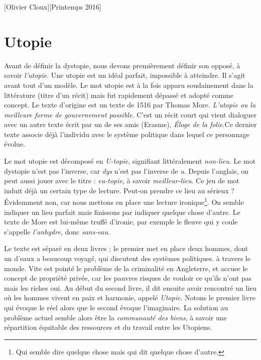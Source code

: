 \documentclass[12pt,a4paper]{book}
\begin{document}
[Olivier Cloux][Printemps 2016]
\tableofcontents
{}

\chapter{Utopie}
Avant de définir la dystopie, nous devons premièrement définir son opposé, à savoir \textit{l'utopie}. Une utopie est un idéal parfait, impossible à atteindre. Il s'agit avant tout d'un modèle. Le mot utopie est à la fois apparu soudainement dans la littérature (titre d'un récit) mais fut rapidement dépassé et adopté comme concept. Le texte d'origine est un texte de 1516 par Thomas More. \textit{L'utopie ou la meilleure forme de gouvernement possible}. C'est un récit court qui vient dialoguer avec un autre texte écrit par un de ses amis (Erasme), \textit{Éloge de la folie}.Ce dernier texte associe déjà l'individu avec le système politique dans lequel ce personnage évolue.

Le mot utopie est décomposé en \textit{U-topie}, signifiant littéralement \textit{non-lieu}. Le mot dystopie n'est pas l'inverse, car \textit{dys} n'est pas l'inverse de \textit{u}. Depuis l'anglais, on peut aussi jouer avec le titre : \textit{eu-topie}, à savoir \textit{meilleur-lieu}.  Ce jeu de mot induit déjà un certain type de lecture. Peut-on prendre ce lieu au sérieux ? Évidemment non, car nous mettons en place une lecture ironique\footnote{Qui semble dire quelque chose mais qui dit quelque chose d'autre.}. On semble indiquer un lieu parfait mais finissons par indiquer quelque chose d'autre. Le texte de More est lui-même truffé d'ironie, par exemple le fleuve qui y coule s'appelle \textit{l'anhydre}, donc \textit{sans-eau}.

Le texte est séparé en deux livres ; le premier met en place deux hommes, dont un d'eaux a beaucoup voyagé, qui discutent des systèmes politiques. à travers le monde. Vite est pointé le problème de la criminalité en Angleterre, et accuse le concept de propriété privée, car les pauvres risques de vouloir ce qu'ils n'ont pas mais les riches oui. Au début du second livre, il dit ensuite avoir rencontré un lieu où les hommes vivent en paix et harmonie, appelé \textit{Utopie}. Notons le premier livre qui évoque le réel alors que le second évoque l'imaginaire. La solution au problème actuel semble alors être la \textit{communauté des biens}, à savoir une répartition équitable des ressources et du travail entre les Utopiens.
\end{document}
